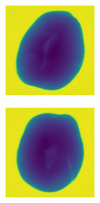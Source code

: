 \documentclass[11pt]{article}
\begin{document}
\begin{figure}[!h]
\begin{subfigure}[b]{0.22\textwidth}
         \caption{}
         \label{fig:hollow_7}
     \end{subfigure}
     \\
    \begin{subfigure}[b]{0.22\textwidth}
         \centering
         \includegraphics[width=\textwidth]{figurer/potato_dataset/hollow/hollow_8.jpg}
         \caption{}
         \label{fig:hollow_8}
     \end{subfigure}
     \hfill
     \begin{subfigure}[b]{0.22\textwidth}
         \centering
         \includegraphics[width=\textwidth]{figurer/potato_dataset/hollow/hollow_9.jpg}

\end{subfigure}
\end{figure}
\end{document}
